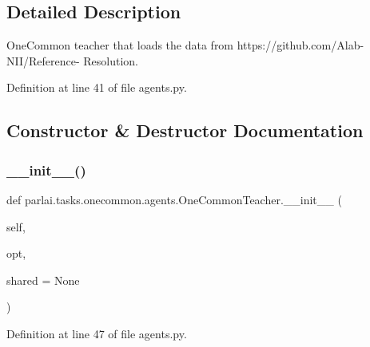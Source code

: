 \subsection{Detailed Description}
\begin{DoxyVerb}OneCommon teacher that loads the data from https://github.com/Alab-NII/Reference-
Resolution.
\end{DoxyVerb}
 

Definition at line 41 of file agents.\+py.



\subsection{Constructor \& Destructor Documentation}
\mbox{\label{classparlai_1_1tasks_1_1onecommon_1_1agents_1_1OneCommonTeacher_aafdf8313f407516bd2143e2839534a0c}} 
\subsubsection{\texorpdfstring{\+\_\+\+\_\+init\+\_\+\+\_\+()}{\_\_init\_\_()}}
{\footnotesize\ttfamily def parlai.\+tasks.\+onecommon.\+agents.\+One\+Common\+Teacher.\+\_\+\+\_\+init\+\_\+\+\_\+ (\begin{DoxyParamCaption}\item[{}]{self,  }\item[{}]{opt,  }\item[{}]{shared = {\ttfamily None} }\end{DoxyParamCaption})}



Definition at line 47 of file agents.\+py.


